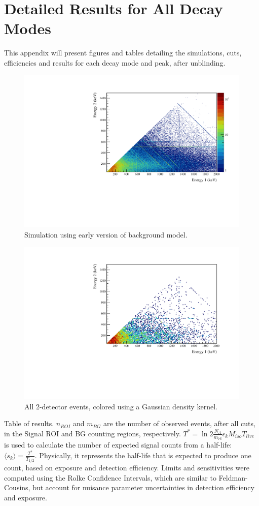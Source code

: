 \documentclass[/main.tex]{subfiles}
\begin{document}
\onlyinsubfile{\appendix}
\chapter{Detailed Results for All Decay Modes}

This appendix will present figures and tables detailing the simulations, cuts, efficiencies and results for each decay mode and peak, after unblinding.

\begin{figure}[!htb]
  \centering
  \includegraphics[width=.8\linewidth]{BGsim}
  \caption{
    Simulation using early version of background model.
    }
\end{figure}
\begin{figure}[!htb]
  \centering
  \includegraphics[width=.8\linewidth]{Data2D}
  \caption{
    All 2-detector events, colored using a Gaussian density kernel.
    }
\end{figure}

\begin{table}[!h]
  \scriptsize
  \centering
  
  \caption{Table of results. $n_{ROI}$ and $m_{BG}$ are the number of observed events, after all cuts, in the Signal ROI and BG counting regions, respectively. $T^*=\ln2 \frac{N_A}{m_{76}}\epsilon_kM_{iso}T_{live}$ is used to calculate the number of expected signal counts from a half-life: $\langle s_k\rangle = \frac{T^*}{T_{1/2}}$. Physically, it represents the half-life that is expected to produce one count, based on exposure and detection efficiency. Limits and sensitivities were computed using the Rolke Confidence Intervals, which are similar to Feldman-Cousins, but account for nuisance parameter uncertainties in detection efficiency and exposure.}
\end{table}
\FloatBarrier
\end{document}
